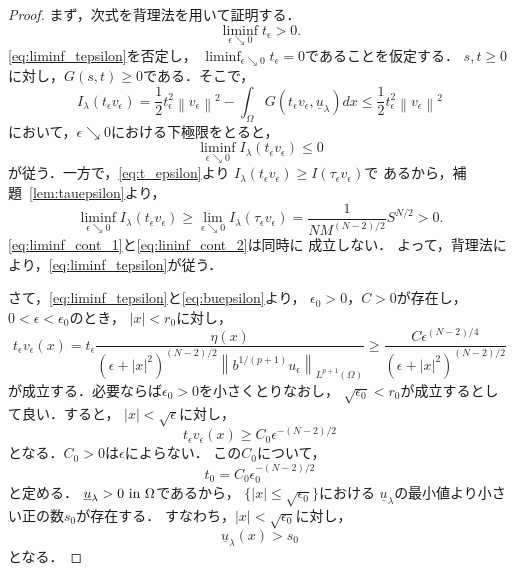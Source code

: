 \begin{proof}
まず，次式を背理法を用いて証明する．
\begin{equation}
 \liminf_{\epsilon \searrow 0} t_\epsilon > 0. \label{eq:liminf_tepsilon}
\end{equation}
\eqref{eq:liminf_tepsilon}を否定し，
$\liminf_{\epsilon \searrow 0} t_\epsilon = 0$であることを仮定する．
$s, t \geq 0$に対し，$G(s, t) \geq 0$である．そこで，
\begin{equation}
 I_\lambda(t_\epsilon v_\epsilon) = \frac{1}{2} t_\epsilon^2 \left\|
                                                              v_\epsilon
                                                             \right\|^2
 - \int_\Omega G(t_\epsilon v_\epsilon, \underline{u}_\lambda) dx \leq
 \frac{1}{2} t_\epsilon^2 \left\| v_\epsilon \right\|^2
\end{equation}
において，$\epsilon \searrow 0$における下極限をとると，
\begin{equation}
 \liminf_{\epsilon \searrow 0} I_\lambda (t_\epsilon v_\epsilon) \leq
  0 \label{eq:liminf_cont_1}
\end{equation}
が従う．一方で，\eqref{eq:t_epsilon}より
$I_\lambda(t_\epsilon v_\epsilon) \geq I(\tau_\epsilon v_\epsilon)$で
あるから，補題~\ref{lem:tauepsilon}より，
\begin{equation}
  \liminf_{\epsilon \searrow 0} I_\lambda(t_\epsilon v_\epsilon) \geq
 \lim_{\epsilon \searrow 0} I_\lambda (\tau_\epsilon v_\epsilon) =
 \frac{1}{NM^{(N-2)/2}} S^{N/2} > 0. \label{eq:lininf_cont_2}
\end{equation}
\eqref{eq:liminf_cont_1}と\eqref{eq:lininf_cont_2}は同時に
成立しない．
よって，背理法により，\eqref{eq:liminf_tepsilon}が従う． 

さて，\eqref{eq:liminf_tepsilon}と\eqref{eq:buepsilon}より，
$\epsilon_0 > 0$，$C > 0$が存在し，$0 <\epsilon < \epsilon_0$のとき，
$\lvert x \rvert < r_0$に対し，
\begin{equation}
 t_\epsilon v_\epsilon (x) = t_\epsilon \frac{\eta(x)}{(\epsilon +
 \lvert x \rvert^2)^{(N-2)/2} \left\| b^{1/(p+1)} u_\epsilon
 \right\|_{L^{p+1}(\Omega)}} \geq \frac{C
 \epsilon^{(N-2)/4}}{(\epsilon + \lvert x \rvert^2)^{(N-2)/2}} 
 \label{eq:teve_p}
\end{equation}
が成立する．必要ならば$\epsilon_0 > 0$を小さくとりなおし，
$\sqrt{\epsilon_0} < r_0$が成立するとして良い．すると，
$\lvert x \lvert < \sqrt{\epsilon}$に対し，
\begin{equation}
 t_\epsilon v_\epsilon (x) \geq C_0 \epsilon^{-(N-2)/2} \label{eq:teve}
\end{equation}
となる．$C_0 > 0$は$\epsilon$によらない．
この$C_0$について，
\begin{equation}
 t_0 = C_0 \epsilon_0^{-(N-2)/2} \label{eq:t_0_epsilon}
\end{equation}
と定める．
$\underline{u}_\lambda > 0 ~\text{in}~ \Omega$であるから，
$\{ \lvert x \rvert \leq \sqrt{\epsilon_0} \}$における
$\underline{u}_\lambda$の最小値より小さい正の数$s_0$が存在する．
すなわち，$\lvert x \rvert < \sqrt{\epsilon_0}$に対し，
\begin{equation}
 \underline{u}_\lambda (x) > s_0 \label{eq:uus_0}
\end{equation}
となる．


\end{proof}
